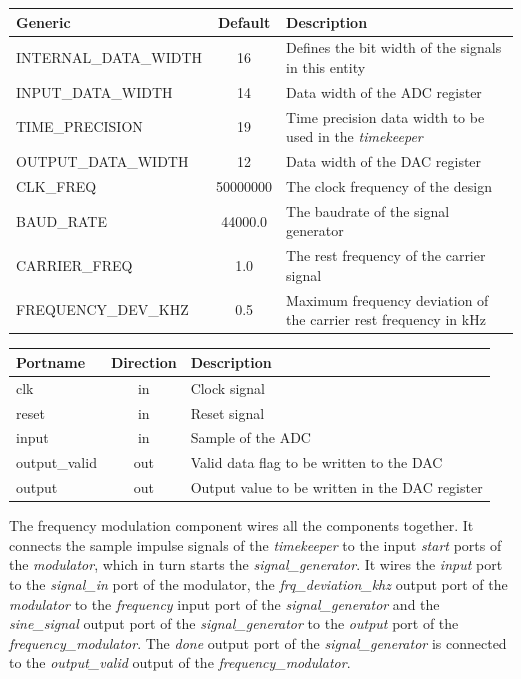 \begin{adjustwidth}{-2.6cm}{}
	\begin{center}
		\begin{tabular}{ | l | c | l | }
			\hline
			\textbf{Generic} & \textbf{Default} & \textbf{Description} \\ \hline
			INTERNAL\_DATA\_WIDTH & 16 & Defines the bit width of the signals in this entity \\
			INPUT\_DATA\_WIDTH & 14 & Data width of the ADC register \\
			TIME\_PRECISION & 19 & Time precision data width to be used in the \textit{timekeeper} \\
			OUTPUT\_DATA\_WIDTH & 12 & Data width of the DAC register \\
			CLK\_FREQ & 50000000 & The clock frequency of the design \\
			BAUD\_RATE & 44000.0 & The baudrate of the signal generator \\
			CARRIER\_FREQ & 1.0 & The rest frequency of the carrier signal \\
			FREQUENCY\_DEV\_KHZ & 0.5 & Maximum frequency deviation of the carrier rest frequency in kHz \\
			\hline
		\end{tabular} 
	\end{center}
\end{adjustwidth}

\begin{center}
	\begin{tabular}{ | l | c | l | }
		\hline
		\textbf{Portname} & \textbf{Direction} & \textbf{Description} \\
		\hline
		clk & in & Clock signal \\
		reset & in  & Reset signal \\
		input & in  & Sample of the ADC \\
		output\_valid & out  & Valid data flag to be written to the DAC \\
		output & out  & Output value to be written in the DAC register \\
		\hline
	\end{tabular} 
\end{center}

The frequency modulation component wires all the components together. It connects the sample impulse signals of the \textit{timekeeper} to the input \textit{start} ports of the \textit{modulator}, which in turn starts the \textit{signal\_generator}. It wires the \textit{input} port to the \textit{signal\_in} port of the modulator, the \textit{frq\_deviation\_khz} output port of the \textit{modulator} to the \textit{frequency} input port of the \textit{signal\_generator} and the \textit{sine\_signal} output port of the \textit{signal\_generator} to the \textit{output} port of the \textit{frequency\_modulator}. The \textit{done} output port of the \textit{signal\_generator} is connected to the \textit{output\_valid} output of the \textit{frequency\_modulator}.




